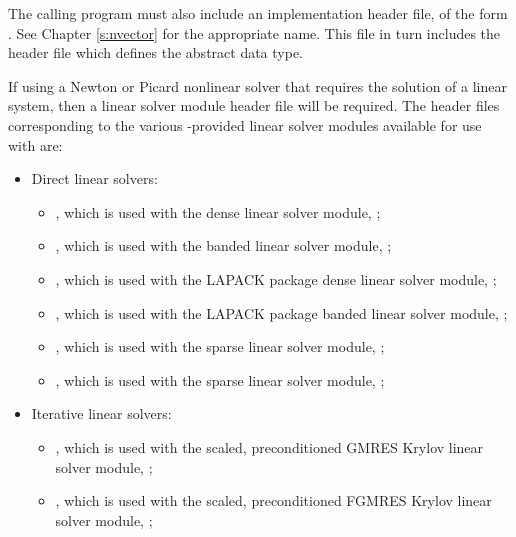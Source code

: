 The calling program must also include an {\nvector} implementation header file,
of the form .  See Chapter \ref{s:nvector} for the appropriate
name.  This file in turn includes the header file 
which defines the abstract  data type.

If using a Newton or Picard nonlinear solver that requires the
solution of a linear system, then a linear solver module header file
will be required.
The header files corresponding to the various {\sundials}-provided
linear solver modules available for use with {\kinsol} are:
\begin{itemize}
\item Direct linear solvers:
  \begin{itemize}
  \item {},
    which is used with the dense linear solver module,
    {\sunlinsoldense};

  \item {},
    which is used with the banded linear solver module,
    {\sunlinsolband};

  \item {},
    which is used with the LAPACK package dense linear solver module,
    {\sunlinsollapdense};

  \item {},
    which is used with the LAPACK package banded linear solver module,
    {\sunlinsollapband};

  \item {},
    which is used with the {\klu} sparse linear solver module,
    {\sunlinsolklu};

  \item {},
    which is used with the {\superlumt} sparse linear solver
    module, {\sunlinsolslumt};
  \end{itemize}

\item Iterative linear solvers:
  \begin{itemize}
  \item {},
   which is used with the scaled, preconditioned GMRES Krylov linear
    solver module, {\sunlinsolspgmr};

  \item {},
    which is used with the scaled, preconditioned FGMRES Krylov linear
    solver module, {\sunlinsolspfgmr};


\end{itemize}
\end{itemize}
